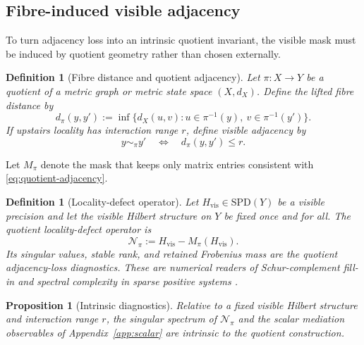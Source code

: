\documentclass[11pt]{article}
\numberwithin{equation}{section}
\newcommand{\SPD}{\mathrm{SPD}}
\theoremstyle{thmcompact}
\newtheorem{proposition}[theorem]{Proposition}
\newtheorem{definition}[theorem]{Definition}
\theoremstyle{remark}
\begin{document}
\subsection{Fibre-induced visible adjacency}

To turn adjacency loss into an intrinsic quotient invariant, the visible mask must be induced by quotient geometry rather than chosen externally.

\begin{definition}[Fibre distance and quotient adjacency]\label{def:fibre-distance}
Let $\pi:X\to Y$ be a quotient of a metric graph or metric state space $(X,d_X)$. Define the lifted fibre distance by
\begin{equation}\label{eq:fibre-distance}
d_\pi(y,y'):=\inf\{d_X(u,v): u\in\pi^{-1}(y),\ v\in\pi^{-1}(y')\}.
\end{equation}
If upstairs locality has interaction range $r$, define visible adjacency by
\begin{equation}\label{eq:quotient-adjacency}
y\sim_\pi y'\quad\Longleftrightarrow\quad d_\pi(y,y')\le r.
\end{equation}
\end{definition}

Let $M_\pi$ denote the mask that keeps only matrix entries consistent with \eqref{eq:quotient-adjacency}.

\begin{definition}[Locality-defect operator]\label{def:locality-defect}
Let $H_{\mathrm{vis}}\in\SPD(Y)$ be a visible precision and let the visible Hilbert structure on $Y$ be fixed once and for all. The quotient locality-defect operator is
\begin{equation}\label{eq:locality-defect}
\mathcal N_\pi:=H_{\mathrm{vis}}-M_\pi(H_{\mathrm{vis}}).
\end{equation}
Its singular values, stable rank, and retained Frobenius mass are the quotient adjacency-loss diagnostics. These are numerical readers of Schur-complement fill-in and spectral complexity in sparse positive systems \cite{GeorgeLiu1981,HornJohnson2013,RudelsonVershynin2007}.
\end{definition}

\begin{proposition}[Intrinsic diagnostics]\label{prop:intrinsic-diagnostics}
Relative to a fixed visible Hilbert structure and interaction range $r$, the singular spectrum of $\mathcal N_\pi$ and the scalar mediation observables of Appendix~\ref{app:scalar} are intrinsic to the quotient construction.
\end{proposition}
\end{document}
